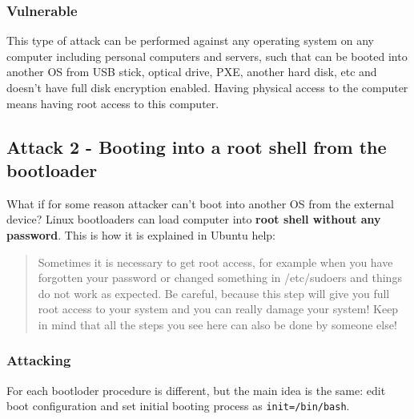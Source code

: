 \subsubsection*{Vulnerable}
This type of attack can be performed against any operating system on any computer including personal computers and servers, such that can be booted into another OS from USB stick, optical drive, PXE, another hard disk, etc and doesn't have full disk encryption enabled. Having physical access to the computer means having root access to this computer.

\subsection{Attack 2 - Booting into a root shell from the bootloader}
What if for some reason attacker can't boot into another OS from the external device? Linux bootloaders can load computer into \textbf{root shell without any password}. This is how it is explained in Ubuntu help:
\begin{quote}
Sometimes it is necessary to get root access, for example when you have forgotten your password or changed something in /etc/sudoers and things do not work as expected.  Be careful, because this step will give you full root access to your system and you can really damage your system! Keep in mind that all the steps you see here can also be done by someone else!~\cite{bootloader-reset-root} 
\end{quote}

\subsubsection*{Attacking}
For each bootloder procedure is different, but the main idea is the same: edit boot configuration and set initial booting process as \texttt{init=/bin/bash}.

